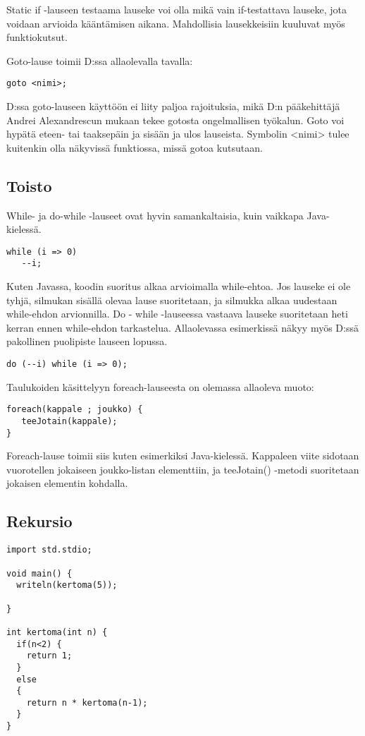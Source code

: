 \documentclass[11pt,oneside,a4paper]{article}
\begin{document}
Static if -lauseen testaama lauseke voi olla mikä vain if-testattava lauseke,
jota voidaan arvioida kääntämisen aikana. Mahdollisia lausekkeisiin kuuluvat
myös funktiokutsut.

Goto-lause toimii D:ssa allaolevalla tavalla:

\begin{verbatim}
goto <nimi>;
\end{verbatim}
D:ssa goto-lauseen käyttöön ei liity paljoa rajoituksia, mikä D:n pääkehittäjä
Andrei Alexandrescun mukaan tekee gotosta ongelmallisen työkalun. Goto voi
hypätä eteen- tai taaksepäin ja sisään ja ulos lauseista. Symbolin <nimi> tulee
kuitenkin olla näkyvissä funktiossa, missä gotoa kutsutaan. 

\subsection{Toisto}

While- ja do-while -lauseet ovat hyvin samankaltaisia, kuin vaikkapa
Java-kielessä. 

\begin{verbatim}
while (i => 0)
   --i;
\end{verbatim}
Kuten Javassa, koodin suoritus alkaa arvioimalla while-ehtoa. Jos lauseke ei ole
tyhjä, silmukan sisällä olevaa lause suoritetaan, ja silmukka alkaa uudestaan
while-ehdon arvionnilla. Do - while -lauseessa vastaava lauseke suoritetaan heti
kerran ennen while-ehdon tarkastelua. Allaolevassa esimerkissä näkyy myös D:ssä
pakollinen puolipiste lauseen lopussa.

\begin{verbatim}
do (--i) while (i => 0);
\end{verbatim}
Taulukoiden käsittelyyn foreach-lauseesta on olemassa allaoleva muoto:

\begin{verbatim}
foreach(kappale ; joukko) {
   teeJotain(kappale);
}
\end{verbatim}
Foreach-lause toimii siis kuten esimerkiksi Java-kielessä. Kappaleen viite sidotaan vuorotellen jokaiseen joukko-listan elementtiin, ja teeJotain() -metodi
suoritetaan jokaisen elementin kohdalla. 

\subsection{Rekursio}

\begin{verbatim}
import std.stdio;

void main() {
  writeln(kertoma(5));

}

int kertoma(int n) {
  if(n<2) {
    return 1;
  }
  else
  {
    return n * kertoma(n-1);
  }
}
\end{verbatim}
\end{document}
